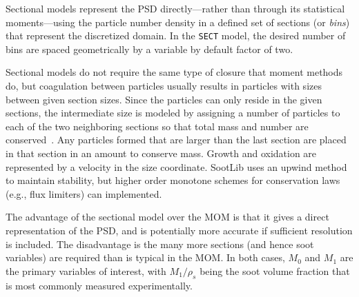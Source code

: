 \documentclass[preprint,letterpaper]{elsarticle}
\begin{document}
Sectional models represent the PSD directly---rather than through its statistical moments---using the particle number density in a defined set of sections (or \emph{bins}) that represent the discretized domain. In the \texttt{SECT} model, the desired number of bins are spaced geometrically by a variable by default factor of two.

Sectional models do not require the same type of closure that moment methods do, but coagulation between particles usually results in particles with sizes between given section sizes. Since the particles can only reside in the given sections, the intermediate size is modeled by assigning a number of particles to each of the two neighboring sections so that total mass and number are conserved~\cite{Lehtinen_2001}. Any particles formed that are larger than the last section are placed in that section in an amount to conserve mass. Growth and oxidation are represented by a velocity in the size coordinate. SootLib uses an upwind method to maintain stability, but higher order monotone schemes for conservation laws (e.g., flux limiters) can implemented.

The advantage of the sectional model over the MOM is that it gives a direct representation of the PSD, and is potentially more accurate if sufficient resolution is included. The disadvantage is the many more sections (and hence soot variables) are required than is typical in the MOM. In both cases, $M_0$ and $M_1$ are the primary variables of interest, with $M_1/\rho_s$ being the soot volume fraction that is most commonly measured experimentally.
\end{document}

